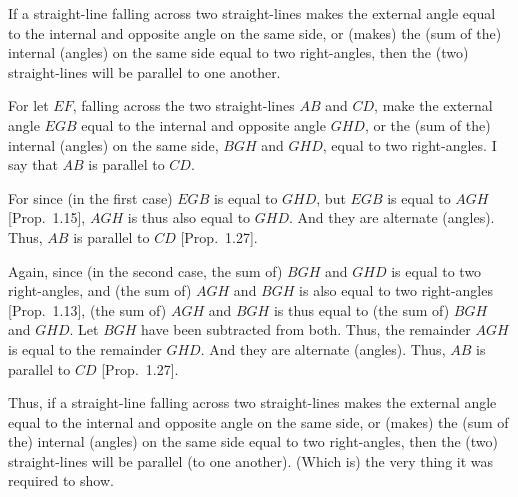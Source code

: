 \begin{Parallel}{}{}
{If a straight-line falling across two straight-lines makes the external angle equal
to the internal and opposite angle on the same side, or (makes) the (sum  of the) internal
(angles) on the same side equal
to two right-angles, then the (two) straight-lines will be parallel to
one another.

\epsfysize=2.2in
\centerline{}

For let $EF$, falling across the two straight-lines $AB$ and $CD$, make the external
angle $EGB$ equal to the internal and opposite angle $GHD$, or the (sum of the) internal
(angles) on the same side, $BGH$ and $GHD$, equal to two right-angles.
I say that $AB$ is parallel to $CD$.

For since (in the first case) $EGB$ is equal to $GHD$, but $EGB$ is equal to $AGH$ [Prop.~1.15],
$AGH$ is thus also equal to $GHD$. And they are alternate (angles).
Thus, $AB$ is
 parallel to $CD$ [Prop.~1.27].
 
Again, since (in the second case, the sum of) $BGH$ and $GHD$ is equal to two right-angles,  and (the sum of) $AGH$ and
$BGH$ is also equal to two right-angles [Prop.~1.13], 
(the sum of) $AGH$ and $BGH$ is thus equal to (the sum of) $BGH$ and $GHD$. Let $BGH$ have been
subtracted from both. Thus, the remainder $AGH$ is equal to the remainder
$GHD$. And they are alternate (angles). Thus, $AB$ is parallel
to $CD$ [Prop.~1.27].

Thus, if a straight-line falling across  two straight-lines makes the external angle equal
to the internal and opposite angle on the same side, or (makes) the (sum of the) internal
(angles) on the same side equal
to two right-angles, then the (two) straight-lines will be parallel (to
one another). (Which is) the very thing it was required to show.}
\end{Parallel}

